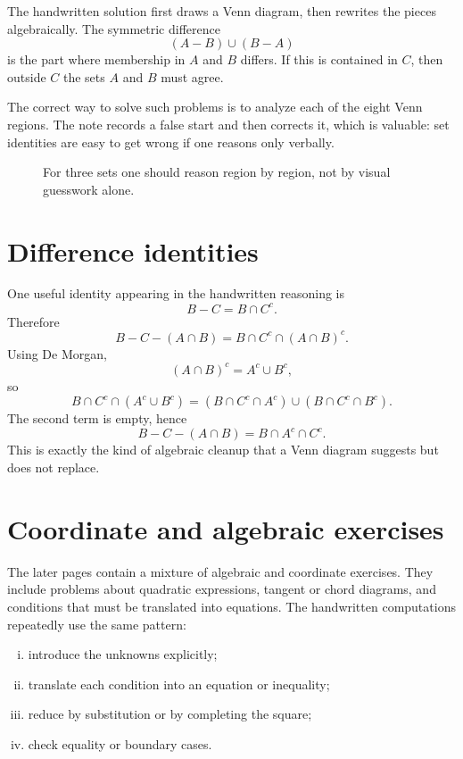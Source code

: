 The handwritten solution first draws a Venn diagram, then rewrites the pieces algebraically.  The symmetric difference
\[
  (A-B)\cup(B-A)
\]
is the part where membership in \(A\) and \(B\) differs.  If this is contained in \(C\), then outside \(C\) the sets \(A\) and \(B\) must agree.

The correct way to solve such problems is to analyze each of the eight Venn regions.  The note records a false start and then corrects it, which is valuable: set identities are easy to get wrong if one reasons only verbally.

\begin{figure}[H]
\centering
{}
\caption{For three sets one should reason region by region, not by visual guesswork alone.}
\end{figure}

\section{Difference identities}

One useful identity appearing in the handwritten reasoning is
\[
  B-C=B\cap C^c.
\]
Therefore
\[
  B-C-(A\cap B)
  =
  B\cap C^c\cap(A\cap B)^c.
\]
Using De Morgan,
\[
  (A\cap B)^c=A^c\cup B^c,
\]
so
\[
  B\cap C^c\cap(A^c\cup B^c)
  =
  (B\cap C^c\cap A^c)\cup(B\cap C^c\cap B^c).
\]
The second term is empty, hence
\[
  B-C-(A\cap B)=B\cap A^c\cap C^c.
\]
This is exactly the kind of algebraic cleanup that a Venn diagram suggests but does not replace.

\section{Coordinate and algebraic exercises}

The later pages contain a mixture of algebraic and coordinate exercises.  They include problems about quadratic expressions, tangent or chord diagrams, and conditions that must be translated into equations.  The handwritten computations repeatedly use the same pattern:
\begin{enumerate}[(i)]
  \item introduce the unknowns explicitly;
  \item translate each condition into an equation or inequality;
  \item reduce by substitution or by completing the square;
  \item check equality or boundary cases.

\end{enumerate}

